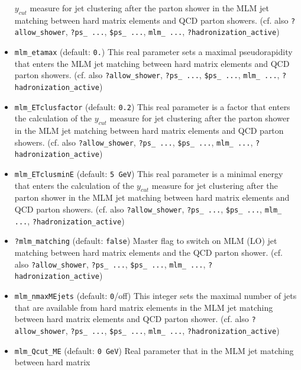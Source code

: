 \documentclass[12pt]{book}
\newcommand{\ttt}[1]{\texttt{#1}}
\begin{document}
\begin{itemize}
$y_{cut}$ measure for jet clustering after the parton shower in the
MLM jet matching between hard matrix elements and QCD parton showers. 
(cf. also \ttt{?allow\_shower}, \ttt{?ps\_ ...}, \ttt{\$ps\_ ...},
\ttt{mlm\_ ...}, \ttt{?hadronization\_active})  
\item
\ttt{mlm\_etamax} \qquad (default: \ttt{0.}) \newline
This real parameter sets a maximal pseudorapidity that enters the 
MLM jet matching between hard matrix elements and QCD parton showers.
(cf. also \ttt{?allow\_shower}, \ttt{?ps\_ ...}, \ttt{\$ps\_ ...},
\ttt{mlm\_ ...}, \ttt{?hadronization\_active}) 
\item
\ttt{mlm\_ETclusfactor} \qquad (default: \ttt{0.2}) \newline
This real parameter is a factor that enters the calculation of the
$y_{cut}$ measure for jet clustering after the parton shower in the
MLM jet matching between hard matrix elements and QCD parton showers. 
(cf. also \ttt{?allow\_shower}, \ttt{?ps\_ ...}, \ttt{\$ps\_ ...},
\ttt{mlm\_ ...}, \ttt{?hadronization\_active})  
\item
\ttt{mlm\_ETclusminE} \qquad (default: \ttt{5 GeV}) \newline
This real parameter is a minimal energy that enters the calculation of
the $y_{cut}$ measure for jet clustering after the parton shower in the
MLM jet matching between hard matrix elements and QCD parton showers. 
(cf. also \ttt{?allow\_shower}, \ttt{?ps\_ ...}, \ttt{\$ps\_ ...},
\ttt{mlm\_ ...}, \ttt{?hadronization\_active})  
\item
\ttt{?mlm\_matching} \qquad (default: \ttt{false}) \newline
Master flag to switch on MLM (LO) jet matching between hard matrix
elements and the QCD parton shower. (cf. also
\ttt{?allow\_shower}, \ttt{?ps\_ ...}, \ttt{\$ps\_ ...}, \ttt{mlm\_
...}, \ttt{?hadronization\_active})  
\item
\ttt{mlm\_nmaxMEjets} \qquad (default: \ttt{0}/off) \newline
This integer sets the maximal number of jets that are available from
hard matrix elements in the MLM jet matching between hard matrix
elements and QCD parton shower. (cf. also
\ttt{?allow\_shower}, \ttt{?ps\_ ...}, \ttt{\$ps\_ ...}, \ttt{mlm\_
...}, \ttt{?hadronization\_active})
\item
\ttt{mlm\_Qcut\_ME} \qquad (default: \ttt{0 GeV}) \newline
Real parameter that in the MLM jet matching between hard matrix

\end{itemize}
\end{document}
